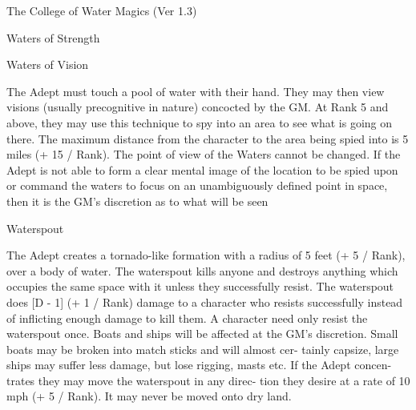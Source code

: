 \begin{Chapter}{The College of Water Magics (Ver 1.3)}
\begin{spell}[S-12]{Waters of Strength }
\begin{effects}
\end{effects}
\end{spell}

\begin{spell}[S-13]{Waters of Vision }

\begin{effects}
The Adept must touch a pool of water with 
their  hand.  They  may  then  view  visions  (usually 
precognitive  in  nature)  concocted  by  the  GM.  At 
Rank 5 and  above,  they  may  use  this  technique  to 
spy into an area to see what is going on there. The 
maximum  distance  from  the  character  to  the  area 
being spied into is 5 miles (+ 15 / Rank). The point 
of  view  of  the  Waters  cannot  be  changed.  If  the 
Adept  is  not  able  to  form a  clear  mental  image  of 
the  location  to  be  spied  upon  or  command  the 
waters to focus on an unambiguously defined point 
in  space,  then it is  the  GM’s  discretion  as to  what 
will be seen 

\end{effects}
\end{spell}

\begin{spell}[S-14]{Waterspout }
\begin{effects}
The Adept creates a tornado-like formation 
with a radius of 5 feet (+ 5 / Rank), over a body of 
water.  The  waterspout  kills  anyone  and  destroys 
anything  which  occupies  the  same  space  with  it 
unless  they  successfully  resist.  The  waterspout 
does  [D  -  1]  (+  1  /  Rank)  damage  to  a  character 
who  resists  successfully instead  of 
inflicting 
enough damage to kill them. A character need only 
resist the waterspout once. Boats and ships will be 
affected  at  the  GM’s  discretion.  Small  boats  may 
be  broken  into  match  sticks  and  will  almost  cer-
tainly capsize, large ships may suffer less damage, 
but  lose  rigging,  masts  etc.  If  the  Adept  concen-
trates they may move the  waterspout in any direc-
tion they desire at a rate of 10 mph (+ 5 / Rank). It 
may never be moved onto dry land. 


\end{effects}
\end{spell}


\end{Chapter}
